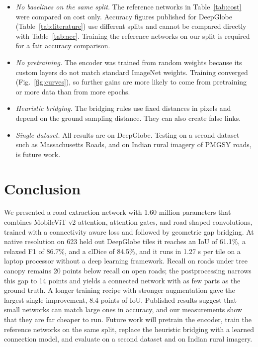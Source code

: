 \documentclass{ieeeaccess}
\begin{document}
\begin{itemize}

\item \emph{No baselines on the same split.} The reference networks in Table~\ref{tab:cost} were compared on cost only. Accuracy figures published for DeepGlobe (Table~\ref{tab:literature}) use different splits and cannot be compared directly with Table~\ref{tab:acc}. Training the reference networks on our split is required for a fair accuracy comparison.

\item \emph{No pretraining.} The encoder was trained from random weights because its custom layers do not match standard ImageNet weights. Training converged (Fig.~\ref{fig:curves}), so further gains are more likely to come from pretraining or more data than from more epochs.

\item \emph{Heuristic bridging.} The bridging rules use fixed distances in pixels and depend on the ground sampling distance. They can also create false links.

\item \emph{Single dataset.} All results are on DeepGlobe. Testing on a second dataset such as Massachusetts Roads, and on Indian rural imagery of PMGSY roads, is future work.

\end{itemize}

\section{Conclusion}
\label{sec:conclusion}

We presented a road extraction network with 1.60 million parameters that combines MobileViT v2 attention, attention gates, and road shaped convolutions, trained with a connectivity aware loss and followed by geometric gap bridging. At native resolution on 623 held out DeepGlobe tiles it reaches an IoU of 61.1\%, a relaxed F1 of 86.7\%, and a clDice of 84.5\%, and it runs in 1.27 s per tile on a laptop processor without a deep learning framework. Recall on roads under tree canopy remains 20 points below recall on open roads; the postprocessing narrows this gap to 14 points and yields a connected network with as few parts as the ground truth. A longer training recipe with stronger augmentation gave the largest single improvement, 8.4 points of IoU. Published results suggest that small networks can match large ones in accuracy, and our measurements show that they are far cheaper to run. Future work will pretrain the encoder, train the reference networks on the same split, replace the heuristic bridging with a learned connection model, and evaluate on a second dataset and on Indian rural imagery.
\end{document}
